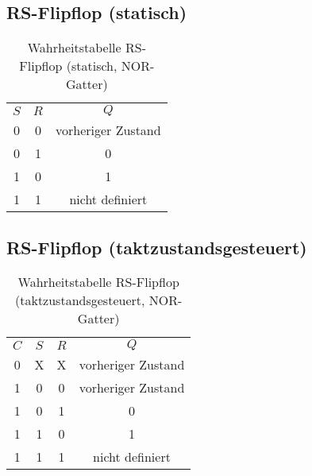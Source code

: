 \subsection{RS-Flipflop (statisch)}

\begin{table}[H]
  \begin{center}
    \begin{tabular}{ccc}
      \rowcolor{gray0} 
      $S$ & $R$ & $Q$                \\
      0   & 0   & vorheriger Zustand \\
      0   & 1   & 0                  \\
      1   & 0   & 1                  \\
      1   & 1   & nicht definiert   
    \end{tabular}
  \end{center}
  \caption{Wahrheitstabelle RS-Flipflop (statisch, NOR-Gatter)}
\end{table}

\subsection{RS-Flipflop (taktzustandsgesteuert)}
\begin{table}[H]
  \begin{center}
    \begin{tabular}{cccc}
      \rowcolor{gray0} 
      $C$ & $S$ & $R$ & $Q$                \\
      0   & X   & X   & vorheriger Zustand \\ \hline
      1   & 0   & 0   & vorheriger Zustand \\
      1   & 0   & 1   & 0                  \\
      1   & 1   & 0   & 1                  \\
      1   & 1   & 1   & nicht definiert   
    \end{tabular}
  \end{center}
  \caption{Wahrheitstabelle RS-Flipflop (taktzustandsgesteuert, NOR-Gatter)}
\end{table}

